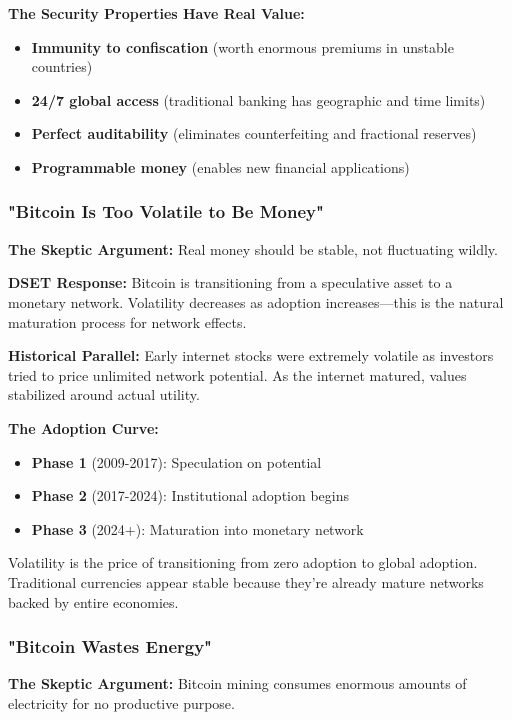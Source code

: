 \documentclass[11pt,oneside]{book}
\begin{document}
\textbf{The Security Properties Have Real Value:}
\begin{itemize}
\item \textbf{Immunity to confiscation} (worth enormous premiums in unstable countries)
\item \textbf{24/7 global access} (traditional banking has geographic and time limits)
\item \textbf{Perfect auditability} (eliminates counterfeiting and fractional reserves)
\item \textbf{Programmable money} (enables new financial applications)
\end{itemize}

\subsubsection{"Bitcoin Is Too Volatile to Be Money"}

\textbf{The Skeptic Argument:} Real money should be stable, not fluctuating wildly.

\textbf{DSET Response:} Bitcoin is transitioning from a speculative asset to a monetary network. Volatility decreases as adoption increases—this is the natural maturation process for network effects.

\textbf{Historical Parallel:} Early internet stocks were extremely volatile as investors tried to price unlimited network potential. As the internet matured, values stabilized around actual utility.

\textbf{The Adoption Curve:}
\begin{itemize}
\item \textbf{Phase 1} (2009-2017): Speculation on potential
\item \textbf{Phase 2} (2017-2024): Institutional adoption begins
\item \textbf{Phase 3} (2024+): Maturation into monetary network
\end{itemize}

Volatility is the price of transitioning from zero adoption to global adoption. Traditional currencies appear stable because they're already mature networks backed by entire economies.

\subsubsection{"Bitcoin Wastes Energy"}

\textbf{The Skeptic Argument:} Bitcoin mining consumes enormous amounts of electricity for no productive purpose.
\end{document}
